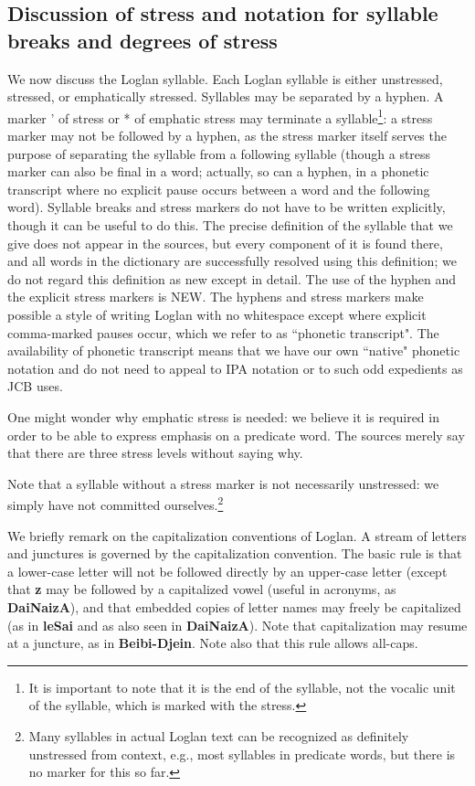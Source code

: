\documentclass[12pt]{book}
\begin{document}
\subsection{Discussion of stress and notation for syllable breaks and degrees of stress}

We now discuss the Loglan syllable.  Each Loglan syllable is either unstressed, stressed, or emphatically stressed.  Syllables may be separated by a hyphen.
A marker ' of stress or * of emphatic stress may terminate a syllable\footnote{It is important to note that it is the end of the syllable, not the vocalic unit of the syllable, which is marked with the stress.}:  a stress marker may not be followed by a hyphen, as the stress marker itself serves the purpose of separating the syllable from a following syllable (though a stress marker can also be final in a word; actually, so can a hyphen, in a phonetic transcript where no explicit pause occurs between a word and the following word).  Syllable breaks and stress markers do not have to be written explicitly, though it can be useful to do this.  The precise definition of the syllable that we give does not appear in the sources, but every component of it is found there, and all words in the dictionary are successfully resolved using this definition;  we do not regard this definition as new except in detail.  The use of the hyphen and the explicit stress markers is NEW.  The hyphens and stress markers make possible a style of writing Loglan with no whitespace except where explicit comma-marked pauses occur, which we refer to as ``phonetic transcript".  The availability of phonetic transcript means that we have our own ``native" phonetic notation and do not need to appeal to IPA notation or to such odd expedients as JCB uses.

One might wonder why emphatic stress is needed:  we believe it is required in order to be able to express emphasis on a predicate word.  The sources merely say that there are three stress levels without saying why.

Note that a syllable without a stress marker is not necessarily unstressed:  we simply have not committed ourselves.\footnote{Many syllables in actual Loglan text can be recognized as definitely unstressed from context, e.g., most syllables in predicate words, but there is no marker for this so far.}

We briefly remark on the capitalization conventions of Loglan.  A stream of letters and junctures is governed by the capitalization convention.  The basic rule is that a lower-case letter will not be followed directly by an upper-case letter (except that {\bf z} may be followed by a capitalized vowel (useful in acronyms, as {\bf DaiNaizA}), and that embedded copies of letter names may freely be capitalized (as in {\bf leSai} and as also seen in {\bf DaiNaizA}).  Note that capitalization may resume at a juncture, as in {\bf Beibi-Djein}.  Note also that this rule allows all-caps.
\end{document}
